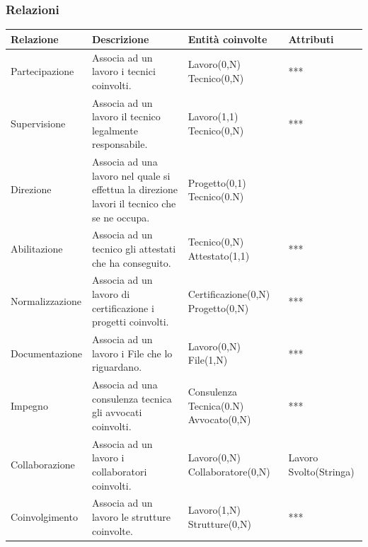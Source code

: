 \documentclass{elegantbook}
\begin{document}
	\subsubsection{Relazioni}
	\begin{longtable}{|p{2.5cm}|p{5cm}|p{3.8cm}|p{4.7cm}|}
            \hline
            \textbf{Relazione} & \textbf{Descrizione} & \textbf{Entità coinvolte} & \textbf{Attributi}\\
            \hline
            Partecipazione
		& Associa ad un lavoro i tecnici coinvolti.
		& Lavoro(0,N) 
		\newline Tecnico(0,N) 
		& ***\\
            \hline
            Supervisione
		& Associa ad un lavoro il tecnico legalmente responsabile.
		& Lavoro(1,1) 
		\newline Tecnico(0,N)
		& ***\\
            \hline
            Direzione 
		& Associa ad una lavoro nel quale si effettua la direzione lavori il tecnico che se ne occupa. 
		& Progetto(0,1) 
		\newline Tecnico(0.N)
		&\\
            \hline
            Abilitazione 
		& Associa ad un tecnico gli attestati che ha conseguito. 
		& Tecnico(0,N) 
		\newline Attestato(1,1) 
		& ***\\
            \hline
            Normalizzazione
		& Associa ad un lavoro di certificazione i progetti coinvolti.
		& Certificazione(0,N) 
		\newline Progetto(0,N) 
		& ***\\
            \hline
            Documentazione 
		& Associa ad un lavoro i File che lo riguardano. 
		& Lavoro(0,N) 
		\newline File(1,N)
		&***\\
            \hline
            Impegno
		& Associa ad una consulenza tecnica gli avvocati coinvolti.
		& Consulenza Tecnica(0.N) 
		\newline Avvocato(0,N) 
		& ***\\
            \hline
            Collaborazione
		& Associa ad un lavoro i collaboratori coinvolti.
		& Lavoro(0,N) 
		\newline Collaboratore(0,N) 
                & Lavoro Svolto(Stringa)\\
            \hline
            Coinvolgimento
		& Associa ad un lavoro le strutture coinvolte.
		& Lavoro(1,N) 
		\newline Strutture(0,N) 
		& ***\\

\end{longtable}
\end{document}
